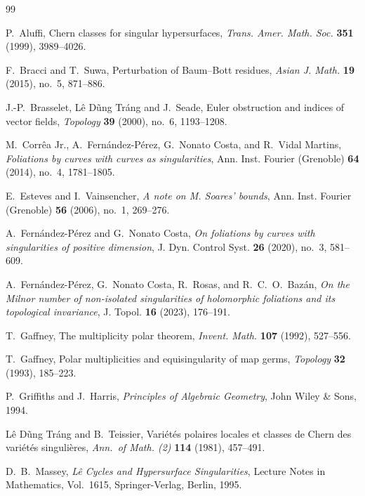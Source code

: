 \documentclass[10pt,twoside]{amsart}
\numberwithin{equation}{section}
\theoremstyle{definition}
\theoremstyle{remark}
\begin{document}
\begin{thebibliography}{99}

P.~Aluffi,
Chern classes for singular hypersurfaces,
\emph{Trans. Amer. Math. Soc.} \textbf{351} (1999), 3989--4026.

F.~Bracci and T.~Suwa,
Perturbation of Baum--Bott residues,
\emph{Asian J. Math.} \textbf{19} (2015), no.~5, 871--886.

J.-P.~Brasselet, L\^e D\~ung Tr\'ang and J.~Seade,
Euler obstruction and indices of vector fields,
\emph{Topology} \textbf{39} (2000), no.~6, 1193--1208.

M.~Corr\^ea Jr., A.~Fern\'andez-P\'erez, G.~Nonato Costa, and R.~Vidal Martins,
\emph{Foliations by curves with curves as singularities},
Ann. Inst. Fourier (Grenoble) \textbf{64} (2014), no.~4, 1781--1805.

 

E.~Esteves and I.~Vainsencher,
\emph{A note on M. Soares' bounds},
Ann. Inst. Fourier (Grenoble) \textbf{56} (2006), no.~1, 269--276.

A.~Fern\'andez-P\'erez and G.~Nonato Costa,
\emph{On foliations by curves with singularities of positive dimension},
J. Dyn. Control Syst. \textbf{26} (2020), no.~3, 581--609.

A.~Fern\'andez-P\'erez, G.~Nonato Costa, R.~Rosas, and R.~C.~O.~Baz\'an,
\emph{On the Milnor number of non-isolated singularities of holomorphic foliations and its topological invariance},
J. Topol. \textbf{16} (2023), 176--191.

T.~Gaffney,
The multiplicity polar theorem,
\emph{Invent. Math.} \textbf{107} (1992), 527--556.

T.~Gaffney,
Polar multiplicities and equisingularity of map germs,
\emph{Topology} \textbf{32} (1993), 185--223.

P.~Griffiths and J.~Harris,
\emph{Principles of Algebraic Geometry},
John Wiley \& Sons, 1994.

L\^e D\~ung Tr\'ang and B.~Teissier,
Vari\'et\'es polaires locales et classes de Chern des vari\'et\'es singuli\`eres,
\emph{Ann.\ of Math. (2)} \textbf{114} (1981), 457--491.

D.~B.~Massey,
\emph{L\^e Cycles and Hypersurface Singularities},
Lecture Notes in Mathematics, Vol.~1615,
Springer-Verlag, Berlin, 1995.


\end{thebibliography}
\end{document}
